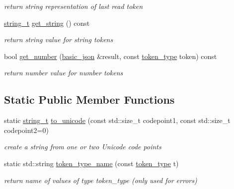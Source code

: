\begin{DoxyCompactItemize}
\begin{DoxyCompactList}\small\item\em return string representation of last read token \end{DoxyCompactList}\item 
\hyperlink{classnlohmann_1_1basic__json_a61f8566a1a85a424c7266fb531dca005}{string\+\_\+t} \hyperlink{classnlohmann_1_1basic__json_1_1lexer_aec16b20aa92501da285967296204f32a}{get\+\_\+string} () const
\begin{DoxyCompactList}\small\item\em return string value for string tokens \end{DoxyCompactList}\item 
bool \hyperlink{classnlohmann_1_1basic__json_1_1lexer_a53a951162c3efbb881b4a31e1f4d6f67}{get\+\_\+number} (\hyperlink{classnlohmann_1_1basic__json}{basic\+\_\+json} \&result, const \hyperlink{classnlohmann_1_1basic__json_1_1lexer_a96887d6cd131e3d3a85a9d71fbdbcdf7}{token\+\_\+type} token) const
\begin{DoxyCompactList}\small\item\em return number value for number tokens \end{DoxyCompactList}\end{DoxyCompactItemize}
\subsection*{Static Public Member Functions}
\begin{DoxyCompactItemize}
\item 
static \hyperlink{classnlohmann_1_1basic__json_a61f8566a1a85a424c7266fb531dca005}{string\+\_\+t} \hyperlink{classnlohmann_1_1basic__json_1_1lexer_acdda4a686d6b4fdd4fd995d0ff62b27e}{to\+\_\+unicode} (const std\+::size\+\_\+t codepoint1, const std\+::size\+\_\+t codepoint2=0)
\begin{DoxyCompactList}\small\item\em create a string from one or two Unicode code points \end{DoxyCompactList}\item 
static std\+::string \hyperlink{classnlohmann_1_1basic__json_1_1lexer_a381fb4f4ec1501fd8327c317c9085628}{token\+\_\+type\+\_\+name} (const \hyperlink{classnlohmann_1_1basic__json_1_1lexer_a96887d6cd131e3d3a85a9d71fbdbcdf7}{token\+\_\+type} t)
\begin{DoxyCompactList}\small\item\em return name of values of type token\+\_\+type (only used for errors) \end{DoxyCompactList}\end{DoxyCompactItemize}
